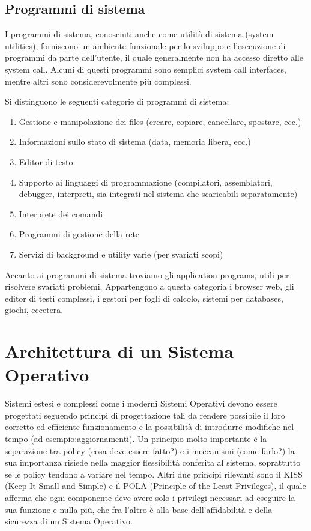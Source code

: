 \documentclass[a4paper]{article}
\begin{document}
\subsection{Programmi di sistema}
I programmi di sistema, conosciuti anche come utilità di sistema (system utilities), forniscono un ambiente funzionale per lo sviluppo e l'esecuzione di programmi da parte dell'utente, il quale generalmente non ha accesso diretto alle system call. Alcuni di questi programmi sono semplici system call interfaces, mentre altri sono considerevolmente più complessi.

Si distinguono le seguenti categorie di programmi di sistema:
\begin{enumerate}
    \item Gestione e manipolazione dei files (creare, copiare, cancellare, spostare, ecc.)
    \item Informazioni sullo stato di sistema (data, memoria libera, ecc.)
    \item Editor di testo
    \item Supporto ai linguaggi di programmazione (compilatori, assemblatori, debugger, interpreti, sia integrati nel sistema che scaricabili separatamente)
    \item Interprete dei comandi
    \item Programmi di gestione della rete
    \item Servizi di background e utility varie (per svariati scopi)
\end{enumerate}

Accanto ai programmi di sistema troviamo gli application programs, utili per risolvere svariati problemi. Appartengono a questa categoria i browser web, gli editor di testi complessi, i gestori per fogli di calcolo, sistemi per databases, giochi, eccetera.


\section{Architettura di un Sistema Operativo}
Sistemi estesi e complessi come i moderni Sistemi Operativi devono essere progettati seguendo principi di progettazione tali da rendere possibile il loro corretto ed efficiente funzionamento e la possibilità di introdurre modifiche nel tempo (ad esempio:aggiornamenti). Un principio molto importante è la separazione tra policy (cosa deve essere fatto?) e i meccanismi (come farlo?) la sua importanza risiede nella maggior flessibilità conferita al sistema, soprattutto se le policy tendono a variare nel tempo.
Altri due principi rilevanti sono il KISS (Keep It Small and Simple) e il POLA (Principle of the Least Privileges), il quale afferma che ogni componente deve avere solo i privilegi necessari ad eseguire la sua funzione e nulla più, che fra l'altro è alla base dell'affidabilità e della sicurezza di un Sistema Operativo.
\end{document}
